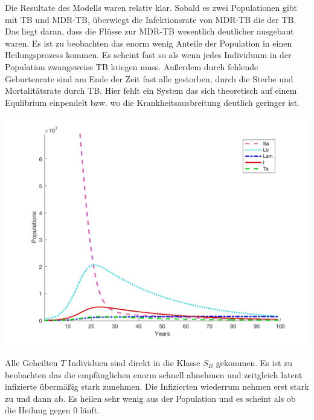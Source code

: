 \documentclass[paper=a4, fontsize=11pt, ngerman, abstract=on]{scrartcl}
\numberwithin{equation}{section} %
\numberwithin{figure}{section} %
\numberwithin{table}{section} %
\begin{document}
Die Resultate des Modells waren relativ klar. Sobald es zwei Populationen gibt mit TB und MDR-TB, überwiegt die Infektionsrate von MDR-TB die der TB.
Das liegt daran, dass die Flüsse zur MDR-TB wesentlich deutlicher ausgebaut waren. Es ist zu beobachten das enorm wenig Anteile der Population in einen Heilungsprozess kommen. Es scheint fast so als wenn jedes Individuum in der Population zwangsweise TB kriegen muss. Außerdem durch fehlende Geburtenrate sind am Ende der Zeit fast alle gestorben, durch die Sterbe und Mortalitätsrate durch TB. Hier fehlt ein System das sich theoretisch auf einem Equlibrium einpendelt bzw. wo die Krankheitsausbreitung deutlich geringer ist.

\begin{minipage}{0.6\linewidth}
  \includegraphics[width=\linewidth]{images/mdr_tb_1}
  \label{fig:mdr-tb-1}
\end{minipage}\hfill
\begin{minipage}{0.4\linewidth}
  Alle Geheilten $T$ Individuen sind direkt in die Klasse $S_{B}$ gekommen. Es ist zu beobachten das die empfänglichen enorm schnell abnehmen und zeitgleich latent infizierte übermäßig stark zunehmen. Die Infizierten wiederrum nehmen erst stark zu und dann ab. Es heilen sehr wenig aus der Population und es scheint als ob die Heilung gegen 0 läuft.
\end{minipage}\\\\
\end{document}
